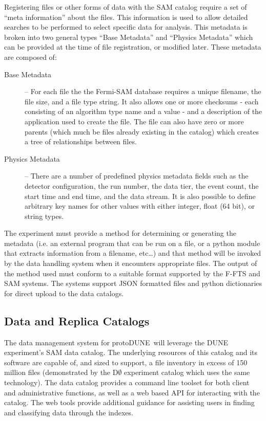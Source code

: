 \documentclass[pdftex,12pt,letter]{article}
\newcommand{\pd}{protoDUNE\ }
\begin{document}
Registering files or other forms of data with the SAM catalog require a set of ``meta information'' about the files.  This information is used to allow detailed searches to be performed to select specific data for analysis.  This metadata is broken into two general types ``Base Metadata'' and ``Physics Metadata'' which can be provided at the time of file registration, or modified later.  These metadata are composed of:
\begin{description}
\item[Base Metadata] -- For each file the the Fermi-SAM database requires a unique filename, the file size, and a file type string. It also allows one or more checksums - each consisting of an algorithm type name and a value - and a description of the application used to create the file. The file can also have zero or more parents (which much be files already existing in the catalog) which creates a tree of relationships between files.
\item[Physics Metadata] -- There are a number of predefined physics metadata fields such as the detector configuration, the run number, the data tier, the event count, the start time and end time, and the data stream. It is also possible to define arbitrary key names for other values with either integer, float (64 bit), or string types.
\end{description}

\noindent
The experiment must provide a method for determining or generating the metadata (i.e. an external program that can be run on a file, or a python module that extracts information from a filename, etc…)  and that method will be invoked by the data handling system when it encounters appropriate files.  The output of the method used must conform to a suitable format supported by the F-FTS and SAM systems.  The systems support JSON formatted files and python dictionaries for direct upload to the data catalogs.  

\subsection{Data and Replica Catalogs}

The data management system for \pd will leverage the DUNE experiment’s SAM data catalog.
 The underlying resources of this catalog and its software are capable of, and sized to support,
a file inventory in excess of 150 million files (demonstrated by the D$\emptyset$ experiment catalog which
uses the same technology).  The data catalog provides a command line toolset for both client and
administrative functions, as well as a web based API for interacting with the catalog.  The web tools
provide additional guidance for assisting users in finding and classifying data through the indexes.
\end{document}
